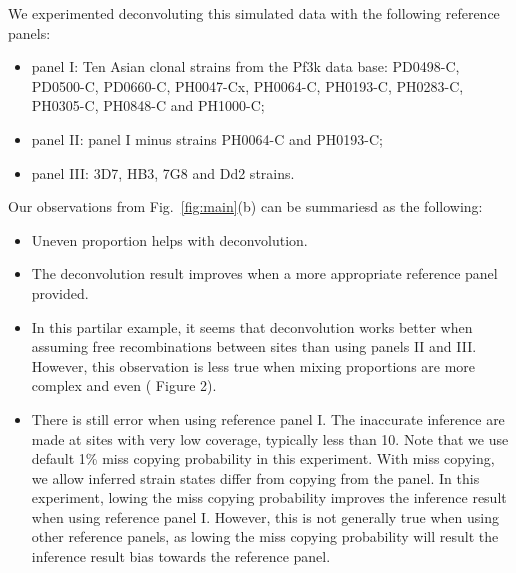 \documentclass{article}
\begin{document}
We experimented deconvoluting this simulated data with the following reference panels:
\begin{itemize}
\item panel I: Ten Asian clonal strains from the Pf3k \citep{Pf3k2016} data base: {\textmd PD0498-C}, {\textmd PD0500-C}, {\textmd PD0660-C}, {\textmd PH0047-Cx}, {\textmd PH0064-C}, {\textmd PH0193-C}, {\textmd PH0283-C}, {\textmd PH0305-C}, {\textmd PH0848-C} and {\textmd PH1000-C};
\item panel II: panel I minus strains {\textmd PH0064-C} and {\textmd PH0193-C};
\item panel III: 3D7, HB3, 7G8 and Dd2 strains.
\end{itemize}

Our observations from Fig.~\ref{fig:main}(b) can be summariesd as the following:
\begin{itemize}
\item Uneven proportion helps with deconvolution.
\item The deconvolution result improves when a more appropriate reference panel provided.
\item In this partilar example, it seems that deconvolution works better when assuming free recombinations between sites than using panels II and III. However, this observation is less true when mixing proportions are more complex and even (\citet{Zhu2017} Figure 2).
\item There is still error when using reference panel I. The inaccurate inference are made at sites with very low coverage, typically less than 10. Note that we use default 1\% miss copying probability in this experiment. With miss copying, we allow inferred strain states differ from copying from the panel. In this experiment, lowing the miss copying probability improves the inference result when using reference panel I. However, this is not generally true when using other reference panels, as lowing the miss copying probability will result the inference result bias towards the reference panel.
\end{itemize}
\end{document}
